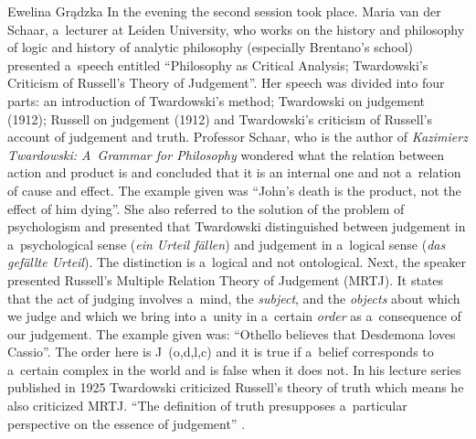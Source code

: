 \begin{editorialeng}{Ewelina Grądzka}
In the evening the second session took place. Maria van der Schaar, a~lecturer at Leiden University, who works on the history and philosophy of logic and history of analytic philosophy (especially Brentano’s school) presented a~speech entitled ``Philosophy as Critical Analysis; Twardowski’s Criticism of Russell’s Theory of Judgement''. Her speech was divided into four parts: an introduction of Twardowski’s method; Twardowski on judgement (1912); Russell on judgement (1912) and Twardowski’s criticism of Russell’s account of judgement and truth. Professor Schaar, who is the author of \textit{Kazimierz Twardowski: A~Grammar for Philosophy}
\parencite*[cf.][]{schaar_kazimierz_2016} %
 wondered what the relation between action and product is and concluded that it is an internal one and not a~relation of cause and effect. The example given was ``John’s death is the product, not the effect of him dying''. She also referred to the solution of the problem of psychologism and presented that Twardowski distinguished between judgement in a~psychological sense (\textit{ein Urteil fällen}) and judgement in a~logical sense (\textit{das gefällte Urteil}). The distinction is a~logical and not ontological. Next, the speaker presented Russell’s Multiple Relation Theory of Judgement (MRTJ). It states that the act of judging involves a~mind, the \textit{subject}, and the \textit{objects} about which we judge and which we bring into a~unity in a~certain \textit{order} as a~consequence of our judgement. The example given was: ``Othello believes that Desdemona loves Cassio''. The order here is J~(o,d,l,c) and it is true if a~belief corresponds to a~certain complex in the world and is false when it does not. In his lecture series published in 1925 
 Twardowski \parencite*[cf.][]{brandl_theory_1999} %
 criticized Russell’s theory of truth which means he also criticized MRTJ. ``The definition of truth presupposes a~particular perspective on the essence of judgement'' 
\parencite[][]{brandl_theory_1999}. %

\end{editorialeng}
